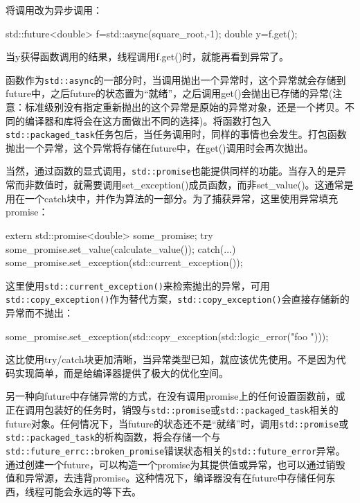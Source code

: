 将调用改为异步调用：

\begin{cpp}
std::future<double> f=std::async(square_root,-1);
double y=f.get();
\end{cpp}

当y获得函数调用的结果，线程调用f.get()时，就能再看到异常了。

函数作为\texttt{std::async}的一部分时，当调用抛出一个异常时，这个异常就会存储到future中，之后future的状态置为“就绪”，之后调用get()会抛出已存储的异常(注意：标准级别没有指定重新抛出的这个异常是原始的异常对象，还是一个拷贝。不同的编译器和库将会在这方面做出不同的选择)。将函数打包入\texttt{std::packaged\_task}任务包后，当任务调用时，同样的事情也会发生。打包函数抛出一个异常，这个异常将存储在future中，在get()调用时会再次抛出。

当然，通过函数的显式调用，\texttt{std::promise}也能提供同样的功能。当存入的是异常而非数值时，就需要调用set\_exception()成员函数，而非set\_value()。这通常是用在一个catch块中，并作为算法的一部分。为了捕获异常，这里使用异常填充promise：

\begin{cpp}
extern std::promise<double> some_promise;
try
{
  some_promise.set_value(calculate_value());
}
catch(...)
{
  some_promise.set_exception(std::current_exception());
}
\end{cpp}

这里使用\texttt{std::current\_exception()}来检索抛出的异常，可用\texttt{std::copy\_exception()}作为替代方案，\texttt{std::copy\_exception()}会直接存储新的异常而不抛出：

\begin{cpp}
some_promise.set_exception(std::copy_exception(std::logic_error("foo ")));
\end{cpp}

这比使用try/catch块更加清晰，当异常类型已知，就应该优先使用。不是因为代码实现简单，而是给编译器提供了极大的优化空间。

另一种向future中存储异常的方式，在没有调用promise上的任何设置函数前，或正在调用包装好的任务时，销毁与\texttt{std::promise}或\texttt{std::packaged\_task}相关的future对象。任何情况下，当future的状态还不是“就绪”时，调用\texttt{std::promise}或\texttt{std::packaged\_task}的析构函数，将会存储一个与\texttt{std::future\_errc::broken\_promise}错误状态相关的\texttt{std::future\_error}异常。通过创建一个future，可以构造一个promise为其提供值或异常，也可以通过销毁值和异常源，去违背promise。这种情况下，编译器没有在future中存储任何东西，线程可能会永远的等下去。

